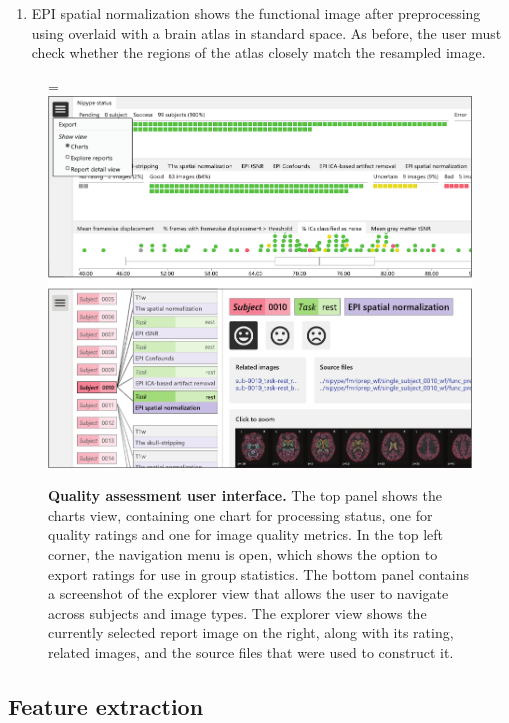 \begin{enumerate}
\item

EPI spatial normalization shows the functional image after preprocessing using  overlaid with a brain atlas in standard space. As before, the user must check whether the regions of the atlas closely match the resampled image.

\end{enumerate}

\begin{figure}[!tb]
    \begin{adjustwidth}{-1cm}{}
        \hsize=\linewidth%
        \includegraphics[width=\linewidth]{fig/quality_assessment-crop}
        \caption{\textbf{Quality assessment user interface.} The top panel shows the charts view, containing one chart for processing status, one for quality ratings and one for image quality metrics. In the top left corner, the navigation menu is open, which shows the option to export ratings for use in group statistics. The bottom panel contains a screenshot of the explorer view that allows the user to navigate across
        subjects and image types. The explorer view shows the currently selected report image on the right, along with its rating, related images, and the source files that were used to construct it.}\label{fig:qa}
    \end{adjustwidth}
\end{figure}

\subsection{Feature extraction}\label{sec:featureextraction}

